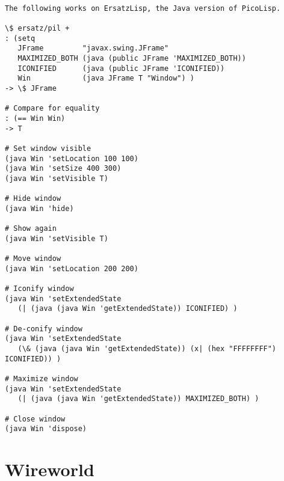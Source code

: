 \begin{verbatim}

The following works on ErsatzLisp, the Java version of PicoLisp.

\$ ersatz/pil +
: (setq
   JFrame         "javax.swing.JFrame"
   MAXIMIZED_BOTH (java (public JFrame 'MAXIMIZED_BOTH))
   ICONIFIED      (java (public JFrame 'ICONIFIED))
   Win            (java JFrame T "Window") )
-> \$ JFrame

# Compare for equality
: (== Win Win)
-> T

# Set window visible
(java Win 'setLocation 100 100)
(java Win 'setSize 400 300)
(java Win 'setVisible T)

# Hide window
(java Win 'hide)

# Show again
(java Win 'setVisible T)

# Move window
(java Win 'setLocation 200 200)

# Iconify window
(java Win 'setExtendedState
   (| (java (java Win 'getExtendedState)) ICONIFIED) )

# De-conify window
(java Win 'setExtendedState
   (\& (java (java Win 'getExtendedState)) (x| (hex "FFFFFFFF") ICONIFIED)) )

# Maximize window
(java Win 'setExtendedState
   (| (java (java Win 'getExtendedState)) MAXIMIZED_BOTH) )

# Close window
(java Win 'dispose)

\end{verbatim}

\section*{Wireworld}

